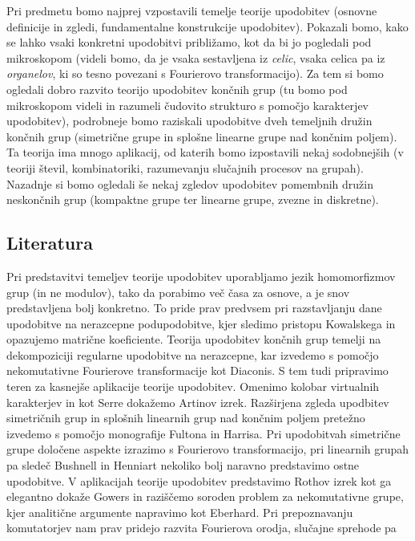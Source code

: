 \documentclass[11pt]{book}
\theoremstyle{definition}
\theoremstyle{zgled}
\theoremstyle{odprtproblem}
\theoremstyle{domacanaloga}
\theoremstyle{izrek}
\begin{document}
Pri predmetu bomo najprej vzpostavili temelje teorije upodobitev (osnovne definicije in zgledi, fundamentalne konstrukcije upodobitev). Pokazali bomo, kako se lahko vsaki konkretni upodobitvi približamo, kot da bi jo pogledali pod mikroskopom (videli bomo, da je vsaka sestavljena iz \emph{celic}, vsaka celica pa iz \emph{organelov}, ki so tesno povezani s Fourierovo transformacijo). Za tem si bomo ogledali dobro razvito teorijo upodobitev končnih grup (tu bomo pod mikroskopom videli in razumeli čudovito strukturo s pomočjo karakterjev upodobitev), podrobneje bomo raziskali upodobitve dveh temeljnih družin končnih grup (simetrične grupe in splošne linearne grupe nad končnim poljem). Ta teorija ima mnogo aplikacij, od katerih bomo izpostavili nekaj sodobnejših (v teoriji števil, kombinatoriki, razumevanju slučajnih procesov na grupah). Nazadnje si bomo ogledali še nekaj zgledov upodobitev pomembnih družin neskončnih grup (kompaktne grupe ter linearne grupe, zvezne in diskretne).


\newpage

\subsection*{Literatura}

Pri predstavitvi temeljev teorije upodobitev uporabljamo jezik homomorfizmov grup (in ne modulov), tako da porabimo več časa za osnove, a je snov predstavljena bolj konkretno. To pride prav predvsem pri razstavljanju dane upodobitve na nerazcepne podupodobitve, kjer sledimo pristopu Kowalskega in opazujemo matrične koeficiente. Teorija upodobitev končnih grup temelji na dekompoziciji regularne upodobitve na nerazcepne, kar izvedemo s pomočjo nekomutativne Fourierove transformacije kot Diaconis. S tem tudi pripravimo teren za kasnejše aplikacije teorije upodobitev. Omenimo kolobar virtualnih karakterjev in kot Serre dokažemo Artinov izrek. Razširjena zgleda upodbitev simetričnih grup in splošnih linearnih grup nad končnim poljem pretežno izvedemo s pomočjo monografije Fultona in Harrisa. Pri upodobitvah simetrične grupe določene aspekte izrazimo s Fourierovo transformacijo, pri linearnih grupah pa sledeč Bushnell in Henniart nekoliko bolj naravno predstavimo ostne upodobitve. V aplikacijah teorije upodobitev predstavimo Rothov izrek kot ga elegantno dokaže Gowers in raziščemo soroden problem za nekomutativne grupe, kjer analitične argumente napravimo kot Eberhard. Pri prepoznavanju komutatorjev nam prav pridejo razvita Fourierova orodja, slučajne sprehode pa 
\end{document}
